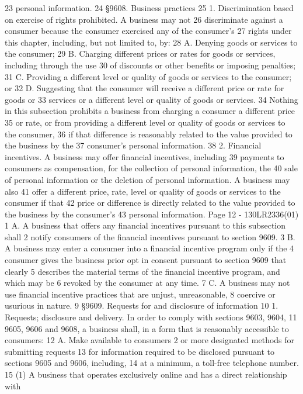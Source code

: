 23 personal information.
24 §9608. Business practices
25 1. Discrimination based on exercise of rights prohibited. A business may not
26 discriminate against a consumer because the consumer exercised any of the consumer's
27 rights under this chapter, including, but not limited to, by:
28 A. Denying goods or services to the consumer;
29 B. Charging different prices or rates for goods or services, including through the use
30 of discounts or other benefits or imposing penalties;
31 C. Providing a different level or quality of goods or services to the consumer; or
32 D. Suggesting that the consumer will receive a different price or rate for goods or
33 services or a different level or quality of goods or services.
34 Nothing in this subsection prohibits a business from charging a consumer a different price
35 or rate, or from providing a different level or quality of goods or services to the consumer,
36 if that difference is reasonably related to the value provided to the business by the
37 consumer's personal information.
38 2. Financial incentives. A business may offer financial incentives, including
39 payments to consumers as compensation, for the collection of personal information, the
40 sale of personal information or the deletion of personal information. A business may also
41 offer a different price, rate, level or quality of goods or services to the consumer if that
42 price or difference is directly related to the value provided to the business by the consumer's
43 personal information.
Page 12 - 130LR2336(01)
1 A. A business that offers any financial incentives pursuant to this subsection shall
2 notify consumers of the financial incentives pursuant to section 9609.
3 B. A business may enter a consumer into a financial incentive program only if the
4 consumer gives the business prior opt in consent pursuant to section 9609 that clearly
5 describes the material terms of the financial incentive program, and which may be
6 revoked by the consumer at any time.
7 C. A business may not use financial incentive practices that are unjust, unreasonable,
8 coercive or usurious in nature.
9 §9609. Requests for and disclosure of information
10 1. Requests; disclosure and delivery. In order to comply with sections 9603, 9604,
11 9605, 9606 and 9608, a business shall, in a form that is reasonably accessible to consumers:
12 A. Make available to consumers 2 or more designated methods for submitting requests
13 for information required to be disclosed pursuant to sections 9605 and 9606, including,
14 at a minimum, a toll-free telephone number.
15 (1) A business that operates exclusively online and has a direct relationship with
